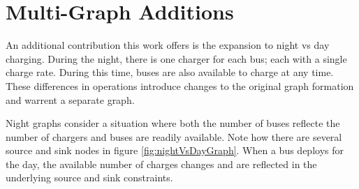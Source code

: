 \section{Multi-Graph Additions}
An additional contribution this work offers is the expansion to night vs day charging. During the night, there is one charger for each bus; each with a single charge rate.  During this time, buses are also available to charge at any time.  These differences in operations introduce changes to the original graph formation and warrent a separate graph.  
\par Night graphs consider a situation where both the number of buses reflecte the number of chargers and buses are readily available.  Note how there are several source and sink nodes in figure \ref{fig:nightVsDayGraph}.  When a bus deploys for the day, the available number of charges changes and are reflected in the underlying source and sink constraints.
